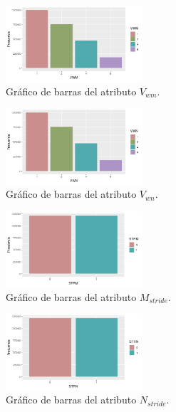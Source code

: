 \documentclass[osajnl,twocolumn,showpacs,superscriptaddress,10pt]{revtex4-1} %
\begin{document}
\begin{figure}[H]
    \centering
    \includegraphics[width=0.45\textwidth]{plots/vwm_bar}
    \caption{Gráfico de barras del atributo $V_{wm}$.}
    \label{figure:vwm_bar}
\end{figure}

\begin{figure}[H]
    \centering
    \includegraphics[width=0.45\textwidth]{plots/vwn_bar}
    \caption{Gráfico de barras del atributo $V_{wn}$.}
    \label{figure:vwn_bar}
\end{figure}

\begin{figure}[H]
    \centering
    \includegraphics[width=0.45\textwidth]{plots/strm_bar}
    \caption{Gráfico de barras del atributo $M_{stride}$.}
    \label{figure:strm_bar}
\end{figure}

\begin{figure}[H]
    \centering
    \includegraphics[width=0.45\textwidth]{plots/strn_bar}
    \caption{Gráfico de barras del atributo $N_{stride}$.}
    \label{figure:strn_bar}
\end{figure}

\onecolumngrid
\end{document}
